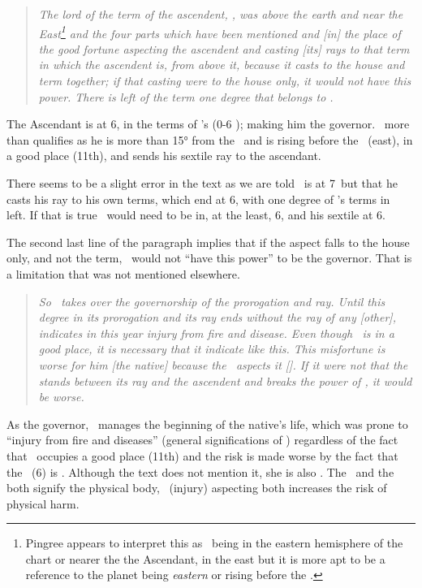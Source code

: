 \begin{quote}
\textsl{The lord of the term of the ascendent, \Mars, was above the earth and near the East\footnote{Pingree appears to interpret this as \Mars\, being in the eastern hemisphere of the chart or nearer the the Ascendant, in the east but it is more apt to be a reference to the planet being \textsl{eastern} or rising before the \Sun.} and the four parts which have been mentioned and [in] the place of the good fortune aspecting the ascendent and casting [its] rays to that term in which the ascendent is, from above it, because it casts to the house and term together; if that casting were to the house only, it would not have this power. There is left of the term one degree that belongs to \Mars.}
\end{quote}

The Ascendant is at 6\Scorpio, in the terms of \Mars's (0-6 \Scorpio); making him the governor. \Mars\, more than qualifies as he is more than 15° from the \Sun\, and is rising before the \Sun\, (east), in a good place (11th), and sends his sextile ray to the ascendant. 

There seems to be a slight error in the text as we are told \Mars\, is at 7\Virgo\, but that he casts his ray to his own terms, which end at 6\Scorpio, with one degree of \Mars's terms in \Scorpio\, left. If that is true \Mars\, would need to be in, at the least, 6\Virgo, and his sextile at 6\Scorpio. 

The second last line of the paragraph implies that if the aspect falls to the house only, and not the term, \Mars\, would not ``have this power'' to be the governor. That is a limitation that was not mentioned elsewhere.

\begin{quote}
\textsl{So \Mars\, takes over the governorship of the prorogation and ray. Until this degree in its prorogation and its ray ends without the ray of any [other], \Mars\, indicates in this year injury from fire and disease. Even though \Mars\, is in a good place, it is necessary that it indicate like this. This misfortune is worse for him [the native] because the \Moon\, aspects it [\Mars]. If it were not that the \Sun\, stands between its ray and the ascendent and breaks the power of \Mars, it would be worse.}
\end{quote}

As the governor, \Mars\, manages the beginning of the native's life, which was prone to ``injury from fire and diseases'' (general significations of \Mars) regardless of the fact that \Mars\, occupies a good place (11th) and the risk is made worse by the fact that the \Moon\, (6\Cancer) is \Sextile\Mars. Although the text does not mention it, she is also \Trine\ASC. The \Moon\, and the \ASC\, both signify the physical body, \Mars\, (injury) aspecting both increases the risk of physical harm.

